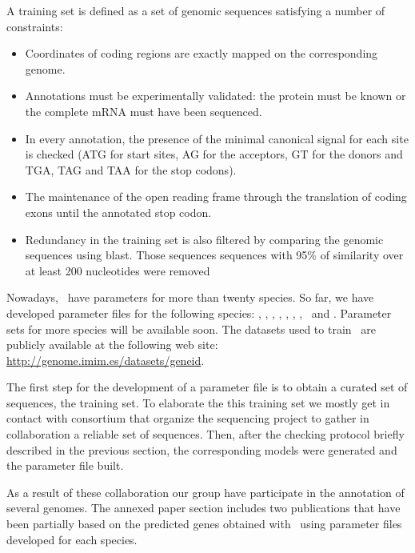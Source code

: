 A training set is defined as a set of genomic sequences satisfying a
number of constraints:
\begin{itemize}
\item Coordinates of coding regions are exactly mapped on the
corresponding genome.

\item Annotations must be experimentally validated: the protein must 
be known or the complete mRNA must have been sequenced.

\item In every annotation, the presence of the minimal canonical signal
for each site is checked (ATG for start sites, AG for the acceptors,
GT for the donors and TGA, TAG and TAA for the stop codons).

\item The maintenance of the open reading frame through the translation 
of coding exons until the annotated stop codon.

\item Redundancy in the training set is also filtered by comparing the 
genomic sequences using blast. Those sequences sequences with 95\% of
similarity over at least 200 nucleotides were removed

\end{itemize}



Nowadays, \geneid\ have parameters for more than twenty species. So
far, we have developed parameter files for the following species:
\AtL, \CeL, \DdL, \DmL, \HsL, \OsL, \PfL, \TnL\ and
\TaL. Parameter sets for more species will be available soon. The
datasets used to train \geneid\ are publicly available at the
following web site: \url{http://genome.imim.es/datasets/geneid}.


The first step for the development of a parameter file is to obtain a
curated set of sequences, the training set. To elaborate the this
training set we mostly get in contact with consortium that organize
the sequencing project to gather in collaboration a reliable set of
sequences. Then, after the checking protocol briefly described in the
previous section, the corresponding models were generated and the
parameter file built.

As a result of these collaboration our group have participate in the
annotation of several genomes. The annexed paper section includes two
publications that have been partially based on the predicted genes
obtained with \geneid\ using parameter files developed for each
species. 


